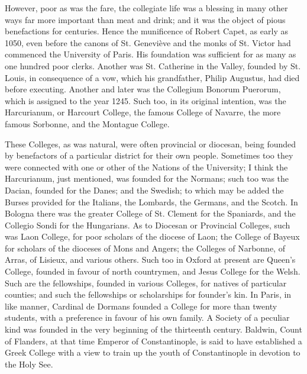 However, poor as was the fare,
the collegiate life was a blessing in many other ways far more
important than meat and drink; and it was the object of pious
benefactions for centuries. Hence the munificence of Robert Capet, as
early as 1050, even before the canons of St. Geneviève and the monks
of St. Victor had commenced the University of Paris. His foundation
was sufficient for as many as one hundred poor clerks. Another was St.
Catherine in the Valley, founded by St. Louis, in consequence of a
vow, which his grandfather, Philip Augustus, had died before
executing. Another and later was the Collegium Bonorum Puerorum, which
is assigned to the year 1245. Such too, in its original
intention, was the Harcurianum, or Harcourt College, the famous
College of Navarre, the more famous Sorbonne, and the Montague
College.

These Colleges, as was
natural, were often provincial or diocesan, being founded by
benefactors of a particular district for their own people. Sometimes
too they were connected with one or other of the Nations of the
University; I think the Harcurianum, just mentioned, was founded for
the Normans; such too was the Dacian, founded for the Danes; and the
Swedish; to which may be added the Burses provided for the Italians,
the Lombards, the Germans, and the Scotch. In Bologna there was the
greater College of St. Clement for the Spaniards, and the Collegio
Sondi for the Hungarians. As to Diocesan or Provincial Colleges, such
was Laon College, for poor scholars of the diocese of Laon; the
College of Bayeux for scholars of the dioceses of Mons and Angers; the
Colleges of Narbonne, of Arras, of Lisieux, and various others. Such
too in Oxford at present are Queen's College, founded in favour of
north countrymen, and Jesus College for the Welsh. Such are the
fellowships, founded in various Colleges, for natives of particular
counties; and such the fellowships or scholarships for founder's kin.
In Paris, in like manner, Cardinal de Dormans founded a College for
more than twenty students, with a preference in favour of his own
family. A Society of a peculiar kind was founded in the very beginning
of the thirteenth century. Baldwin, Count of Flanders, at that time
Emperor of Constantinople, is said to have established a Greek College
with a view to train up the youth of Constantinople in devotion to the
Holy See.

